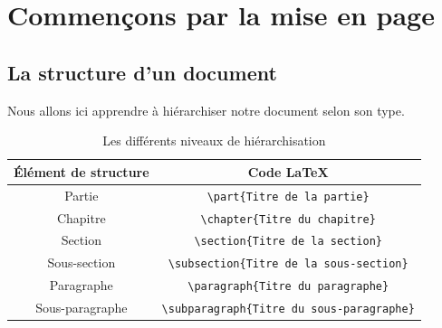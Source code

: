 
\chapter{Commençons par la mise en page}
\section{La structure d'un document}
Nous allons ici apprendre à hiérarchiser notre document selon son type.
\medskip

\begin{table}[h]
\begin{center}
\begin{tabular}{|c|c|}
\hline
\textbf{Élément de structure} & \textbf{Code \LaTeX} \\
\hline
Partie & \verb|\part{Titre de la partie}| \\
\hline 
Chapitre & \verb|\chapter{Titre du chapitre}| \\
\hline
Section & \verb|\section{Titre de la section}| \\
\hline
Sous-section & \verb|\subsection{Titre de la sous-section}| \\
\hline
Paragraphe & \verb|\paragraph{Titre du paragraphe}| \\
\hline
Sous-paragraphe & \verb|\subparagraph{Titre du sous-paragraphe}| \\
\hline
\end{tabular}
\caption{Les différents niveaux de hiérarchisation}
\end{center}
\end{table}
\medskip

